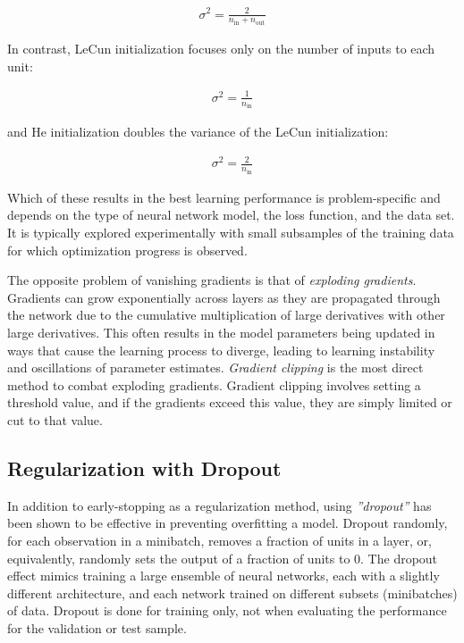 \begin{itemize}
\begin{align*}
  \sigma^2 = \frac{2}{n_{\text{in}} + n_{\text{out}}}
\end{align*}

\noindent In contrast, LeCun initialization focuses only on the number of inputs to each unit:

\begin{align*}
  \sigma^2 = \frac{1}{n_{\text{in}}}
\end{align*}

\noindent and He initialization doubles the variance of the LeCun initialization:

\begin{align*}
  \sigma^2 = \frac{2}{n_{\text{in}}}
\end{align*}

\end{itemize}

Which of these results in the best learning performance is problem-specific and depends on the type of neural network model, the loss function, and the data set. It is typically explored experimentally with small subsamples of the training data for which optimization progress is observed.

The opposite problem of vanishing gradients is that of \emph{exploding gradients}. Gradients can grow exponentially across layers as they are propagated through the network due to the cumulative multiplication of large derivatives with other large derivatives. This often results in the model parameters being updated in ways that cause the learning process to diverge, leading to learning instability and oscillations of parameter estimates. \emph{Gradient clipping} is the most direct method to combat exploding gradients. Gradient clipping involves setting a threshold value, and if the gradients exceed this value, they are simply limited or cut to that value.


\subsection{Regularization with Dropout}

In addition to early-stopping as a regularization method, using \emph{''dropout''} has been shown to be effective in preventing overfitting a model. Dropout randomly, for each observation in a minibatch, removes a fraction of units in a layer, or, equivalently, randomly sets the output of a fraction of units to 0. The dropout effect mimics training a large ensemble of neural networks, each with a slightly different architecture, and each network trained on different subsets (minibatches) of data. Dropout is done for training only, not when evaluating the performance for the validation or test sample.

